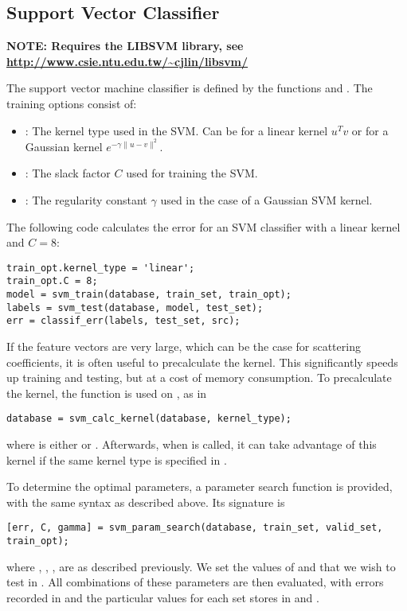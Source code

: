 \documentclass[twocolumn]{article}
\begin{document}
\subsection{Support Vector Classifier}

\textbf{NOTE: Requires the LIBSVM library, see \url{http://www.csie.ntu.edu.tw/~cjlin/libsvm/}}

The support vector machine classifier is defined by the functions  and . The training options consist of:
\begin{itemize}
	\item {}: The kernel type used in the SVM. Can be  for a linear kernel $u^Tv$ or  for a Gaussian kernel $e^{-\gamma\|u-v\|^2}$.
	\item {}: The slack factor $C$ used for training the SVM.
	\item {}: The regularity constant $\gamma$ used in the case of a Gaussian SVM kernel.
\end{itemize}

The following code calculates the error for an SVM classifier with a linear kernel and $C = 8$:
\begin{lstlisting}
train_opt.kernel_type = 'linear';
train_opt.C = 8;
model = svm_train(database, train_set, train_opt);
labels = svm_test(database, model, test_set);
err = classif_err(labels, test_set, src);
\end{lstlisting}

If the feature vectors are very large, which can be the case for scattering coefficients, it is often useful to precalculate the kernel. This significantly speeds up training and testing, but at a cost of memory consumption. To precalculate the kernel, the function  is used on , as in
\begin{lstlisting}
database = svm_calc_kernel(database, kernel_type);
\end{lstlisting}
where  is either  or . Afterwards, when  is called, it can take advantage of this kernel if the same kernel type is specified in .

To determine the optimal parameters, a parameter search function  is provided, with the same syntax as described above. Its signature is
\begin{lstlisting}
[err, C, gamma] = svm_param_search(database, train_set, valid_set, train_opt);
\end{lstlisting}
where , , ,  are as described previously. We set the values of  and  that we wish to test in . All combinations of these parameters are then evaluated, with errors recorded in  and the particular values for each set stores in  and .
\end{document}
